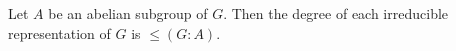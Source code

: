 Let $A$ be an abelian subgroup of $G$. Then the degree of each irreducible representation of $G$ is $\leq (G:A)$.
